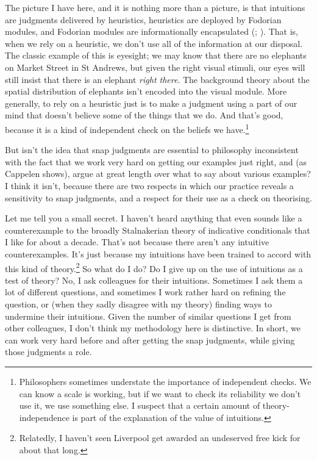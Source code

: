 \documentclass[
  10pt,
  letterpaper,
  DIV=11,
  numbers=noendperiod,
  twoside]{scrartcl}
\begin{document}
The picture I have here, and it is nothing more than a picture, is that
intuitions are judgments delivered by heuristics, heuristics are
deployed by Fodorian modules, and Fodorian modules are informationally
encapsulated (;
). That is, when we rely on a
heuristic, we don't use all of the information at our disposal. The
classic example of this is eyesight; we may know that there are no
elephants on Market Street in St Andrews, but given the right visual
stimuli, our eyes will still insist that there is an elephant
\emph{right there}. The background theory about the spatial distribution
of elephants isn't encoded into the visual module. More generally, to
rely on a heuristic just is to make a judgment using a part of our mind
that doesn't believe some of the things that we do. And that's good,
because it is a kind of independent check on the beliefs we
have.\footnote{Philosophers sometimes understate the importance of
  independent checks. We can know a scale is working, but if we want to
  check its reliability we don't use it, we use something else. I
  suspect that a certain amount of theory-independence is part of the
  explanation of the value of intuitions.}

But isn't the idea that snap judgments are essential to philosophy
inconsistent with the fact that we work very hard on getting our
examples just right, and (as Cappelen shows), argue at great length over
what to say about various examples? I think it isn't, because there are
two respects in which our practice reveals a sensitivity to snap
judgments, and a respect for their use as a check on theorising.

Let me tell you a small secret. I haven't heard anything that even
sounds like a counterexample to the broadly Stalnakerian theory of
indicative conditionals that I like for about a decade. That's not
because there aren't any intuitive counterexamples. It's just because my
intuitions have been trained to accord with this kind of
theory.\footnote{Relatedly, I haven't seen Liverpool get awarded an
  undeserved free kick for about that long.} So what do I do? Do I give
up on the use of intuitions as a test of theory? No, I ask colleagues
for their intuitions. Sometimes I ask them a lot of different questions,
and sometimes I work rather hard on refining the question, or (when they
sadly disagree with my theory) finding ways to undermine their
intuitions. Given the number of similar questions I get from other
colleagues, I don't think my methodology here is distinctive. In short,
we can work very hard before and after getting the snap judgments, while
giving those judgments a role.
\end{document}
